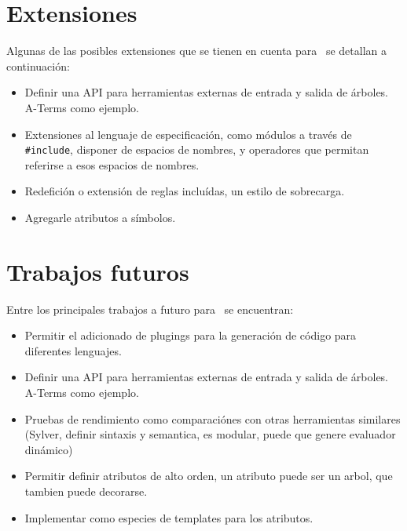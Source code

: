 \section{Extensiones}
Algunas de las posibles extensiones que se tienen en cuenta para \maggen\ se detallan a continuación:
\begin{itemize}
\item Definir una API para herramientas externas de entrada y salida de árboles. A-Terms como ejemplo.
\item Extensiones al lenguaje de especificación, como módulos a través de \texttt{\#include}, disponer de espacios de nombres, y operadores que permitan referirse a esos espacios de nombres.
\item Redefición o extensión de reglas incluídas, un estilo de sobrecarga.
\item Agregarle atributos a símbolos.
\end{itemize}

\section{Trabajos futuros}
Entre los principales trabajos a futuro para \maggen\ se encuentran:
\begin{itemize}
\item Permitir el adicionado de plugings para la generación de código para diferentes lenguajes.
\item Definir una API para herramientas externas de entrada y salida de árboles. A-Terms como ejemplo.
\item Pruebas de rendimiento como comparaciónes con otras herramientas similares (Sylver, definir sintaxis y semantica, es modular, puede que genere evaluador dinámico)

\item Permitir definir atributos de alto orden, un atributo puede ser un arbol, que tambien puede decorarse.
\item Implementar como especies de templates para los atributos.

\end{itemize}